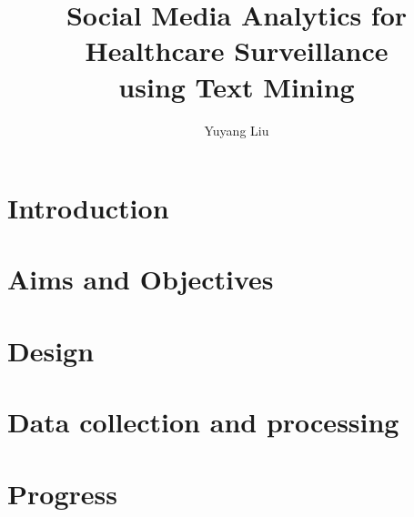 \documentclass[12pt]{report}
\begin{document}
\title{Social Media Analytics for Healthcare Surveillance \\using Text Mining}
\author{Yuyang Liu}
\normallinespacing
\maketitle

\tableofcontents %
\body
\chapter{Introduction} %

 
\chapter{Aims and Objectives}

 
\chapter{Design}


\chapter{Data collection and processing}



\chapter{Progress}




\end{document}
